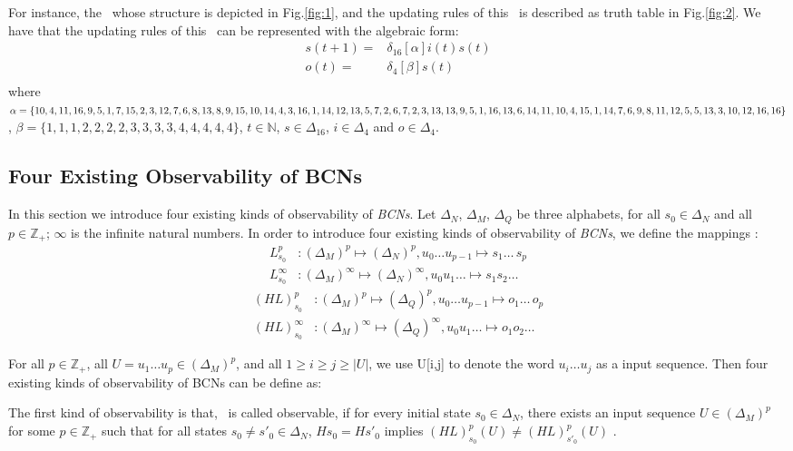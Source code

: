 For instance, the \BCN\ whose structure is depicted in Fig.\ref{fig:1}, and the updating rules of this \BCN\ is described as truth table in Fig.\ref{fig:2}. We have that the updating rules of this \BCN\ can be represented with the algebraic form:
\begin{equation}
\begin{split}
s(t+1) =&\delta_{16}[\alpha]i(t)s(t)\\
o(t) =&\delta_4[\beta]s(t)\\
\end{split}
\end{equation}
where $\alpha=\{10,4,11,16,9,5,1, 7,15,2,3,12,7,6,8,13,8,9,\\15,10,14,4,3,16,1,14,12,13,5,7,2,6,7,2,3,13,13,9,5,1,\\16,13 ,6,14,11,10,4,15,1,14 ,7,6,9 ,8,11,12,5,5,13,3,10,\\12,16,16\}$, $\beta=\{1,1,1,2,2,2,2,3,3,3,3,4,4,4,4,4\}$, $t\in \mathbb{N}$, $s\in \Delta_{16}$, $i\in \Delta_4$ and $o\in \Delta_4$.
\subsection{Four Existing Observability of BCNs}
In this section we introduce four existing kinds of observability of {\em BCNs}. Let $\Delta_N$, $\Delta_M$, $\Delta_Q$ be three alphabets, for all $s_0\in \Delta_N$ and all $p\in \mathbb{Z}_+$; $\infty$ is the infinite natural numbers. In order to introduce four existing kinds of observability of {\em BCNs}, we define the mappings \cite{Zhang2016Observability}:
\begin{equation}
\begin{split}
L^p_{s_0} &: (\Delta_M)^p\mapsto(\Delta_N)^p, u_0\ldots u_{p-1} \mapsto s_1 \ldots\, s_p\\
L^{\infty}_{s_0} &: (\Delta_M)^{\infty}\mapsto(\Delta_N)^{\infty}, u_0 u_1 \ldots  \mapsto s_1 s_2 \ldots
\end{split}
\end{equation}
\begin{equation}
\begin{split}
(HL)^p_{s_0} &: (\Delta_M)^p\mapsto(\Delta_Q)^p, u_0\ldots u_{p-1} \mapsto o_1\ldots\, o_p\\
(HL)^{\infty}_{s_0} &: (\Delta_M)^{\infty}\mapsto(\Delta_Q)^{\infty}, u_0 u_1 \ldots  \mapsto o_1 o_2\ldots
\end{split}
\end{equation}

For all  $p\in \mathbb{Z}_+$, all $U=u_1 \ldots u_p \in(\Delta_M)^p$, and all $1\ge i \ge j \ge |U|$, we use U[i,j] to denote the word $u_i \ldots u_j$ as a input sequence. Then four existing kinds of observability of BCNs can be define as: 
\begin{definition}
The first kind of observability is that, \BCN\ is called observable, if for every initial state $s_0 \in \Delta_N$, there exists an input sequence $U\in(\Delta_M)^p$ for some $p\in \mathbb{Z}_+$ such that for all states $s_0\neq {s'}_0\in \Delta_N$, $Hs_0=H{s'}_0$ implies $(HL)^p_{s_0}(U)\neq (HL)^p_{{s'}_0}(U)$ \cite{cheng2009controllability}.
\end{definition}

